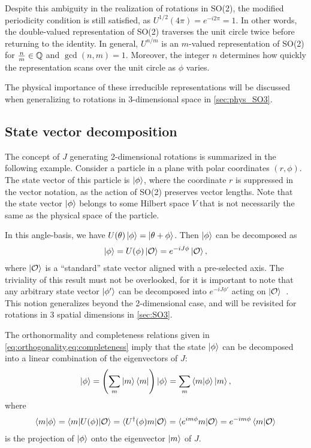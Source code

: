 Despite this ambiguity in the realization of rotations in SO(2), the modified periodicity condition is still satisfied, as $U^{1/2}(4\pi) = e^{-i2\pi} = 1$. In other words, the double-valued representation of SO(2) traverses the unit circle twice before returning to the identity. In general, $U^{n/m}$ is an $m$-valued representation of SO(2) for $\frac{n}{m}\in\mathbb{Q}$ and $\gcd(n,m)=1$. Moreover, the integer $n$ determines how quickly the representation scans over the unit circle as $\phi$ varies.

The physical importance of these irreducible representations will be discussed when generalizing to rotations in 3-dimensional space in \cref{sec:phys_SO3}.

\subsection{State vector decomposition}\label{sub:SO2_decomp}
The concept of $J$ generating 2-dimensional rotations is summarized in the following example. Consider a particle in a plane with polar coordinates $(r,\phi)$. The state vector of this particle is $\ket{\phi}$, where the coordinate $r$ is suppressed in the vector notation, as the action of SO(2) preserves vector lengths. Note that the state vector $\ket{\phi}$ belongs to some Hilbert space $V$ that is not necessarily the same as the physical space of the particle.

In this angle-basis, we have $U(\theta)\ket{\phi} = \ket{\theta+\phi}$. Then $\ket{\phi}$ can be decomposed as
\begin{align}
    \ket{\phi} = U(\phi)\ket{\mathcal{O}} = e^{-iJ\phi}\ket{\mathcal{O}},
\end{align}
where $\ket{\mathcal{O}}$ is a ``standard'' state vector aligned with a pre-selected axis. The triviality of this result must not be overlooked, for it is important to note that any arbitrary state vector $\ket{\phi'}$ can be decomposed into $e^{-iJ\phi'}$ acting on $\ket{\mathcal{O}}$~\cite{Tung1985}. This notion generalizes beyond the 2-dimensional case, and will be revisited for rotations in 3 spatial dimensions in \cref{sec:SO3}.

The orthonormality and completeness relations given in \cref{eq:orthogonality,eq:completeness} imply that
the state $\ket{\phi}$ can be decomposed into a linear combination of the eigenvectors of $J$:
\begin{align}
    \ket{\phi} = \left( \sum_{m} \ket{m}\bra{m} \right)\ket{\phi} = \sum_{m} \braket{m|\phi}\ket{m},
\end{align}
where
\begin{align}
    \braket{m|\phi} = \braket{m|U(\phi)|\mathcal{O}} = \braket{U^\dagger(\phi)m|\mathcal{O}} = \braket{e^{im\phi}m|\mathcal{O}} = e^{-im\phi}\braket{m|\mathcal{O}}
\end{align}
is the projection of $\ket{\phi}$ onto the eigenvector $\ket{m}$ of $J$. 

